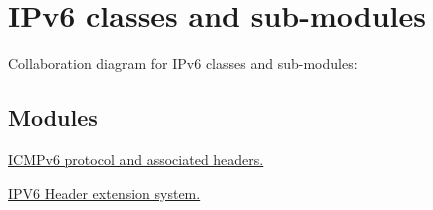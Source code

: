 \hypertarget{group__ipv6}{}\section{I\+Pv6 classes and sub-\/modules}
\label{group__ipv6}
Collaboration diagram for I\+Pv6 classes and sub-\/modules\+:
\subsection*{Modules}
\begin{DoxyCompactItemize}
\item 
\hyperlink{group__icmpv6}{I\+C\+M\+Pv6 protocol and associated headers.}
\item 
\hyperlink{group__ipv6HeaderExt}{I\+P\+V6 Header extension system.}
\end{DoxyCompactItemize}
